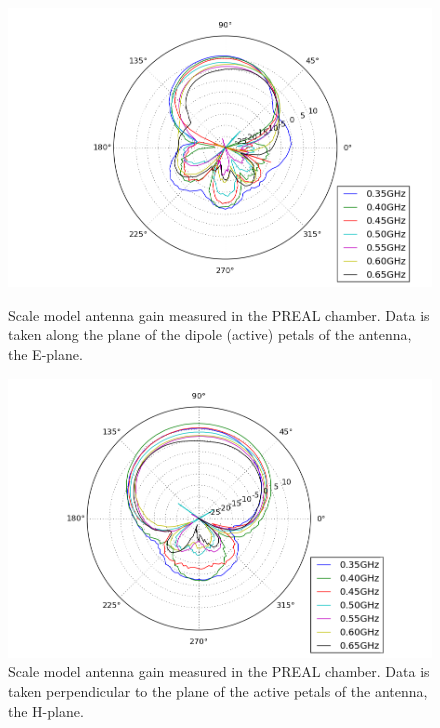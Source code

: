 \begin{figure}[htb]
\centering
\begin{minipage}[b]{0.47\textwidth}
\centering
\includegraphics[width=0.95\linewidth]{SCIHI_system/figures/HIbiscus_Gain_model_H_polar.png}
\caption{Scale model antenna gain measured in the PREAL chamber. Data is taken along the plane of the dipole (active) petals of the antenna, the E-plane. }
\label{Fig:eplane_gain_sm}
\end{minipage}%
\begin{minipage}[b]{0.02\textwidth}
\hspace{1cm}
\end{minipage}%
\begin{minipage}[b]{0.47\textwidth}
\centering
\includegraphics[width=0.95\linewidth]{SCIHI_system/figures/HIbiscus_Gain_model_V_polar.png}
\caption{Scale model antenna gain measured in the PREAL chamber. Data is taken perpendicular to the plane of the active petals of the antenna, the H-plane. }
\label{Fig:hplane_gain_sm}
\end{minipage}
\end{figure}

